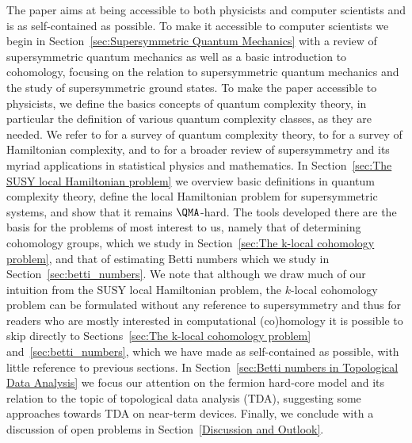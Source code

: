 \documentclass[11pt]{article}
\numberwithin{equation}{section}
\renewcommand\( {\left(}
\renewcommand\) {\right)}
\begin{document}
The paper aims at being accessible to both physicists and computer scientists and is as self-contained as possible. To make it accessible to computer scientists we begin in Section~\ref{sec:Supersymmetric Quantum Mechanics} with a review of supersymmetric quantum mechanics as well as a basic introduction to cohomology, focusing on the relation to supersymmetric quantum mechanics and the study of supersymmetric ground states. To make the paper accessible to physicists, we define the basics concepts of quantum complexity theory, in particular the definition of various quantum complexity classes, as they are needed. We refer to \cite{watrous2008quantum} for a survey of quantum complexity theory, to  \cite{2014arXiv1401.3916G} for a survey of  Hamiltonian complexity, and to  \cite{JunkerSUSYBook,Hori:2003ic} for a  broader review of supersymmetry and its myriad applications in statistical physics and mathematics. In Section~\ref{sec:The SUSY local Hamiltonian problem} we overview basic definitions in quantum complexity theory, define the local Hamiltonian problem for supersymmetric systems, and show that it remains $\QMA$-hard. The tools developed there are the basis for the problems of most interest to us, namely that of determining cohomology groups, which we study in Section~\ref{sec:The k-local cohomology problem}, and that of estimating Betti numbers which we study in Section~\ref{sec:betti_numbers}. We note that although we draw much of our intuition from the  SUSY local Hamiltonian problem, the  $k$-local cohomology problem can be formulated without any reference to supersymmetry and thus for readers who are mostly interested in computational (co)homology it is possible to skip directly to Sections~\ref{sec:The k-local cohomology problem} and~\ref{sec:betti_numbers}, which we have made as self-contained as possible, with little reference to previous sections. In Section~\ref{sec:Betti numbers in Topological Data Analysis} we focus our attention on the fermion hard-core model and its relation to the topic of topological data analysis (TDA), suggesting some approaches towards TDA on near-term devices. Finally, we conclude with a discussion of open problems in Section~\ref{Discussion and Outlook}. 
\end{document}
